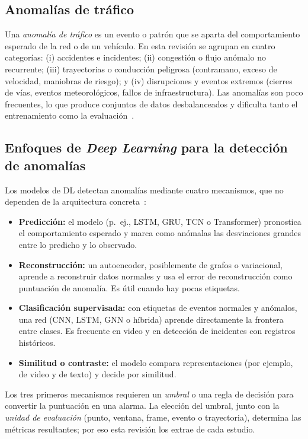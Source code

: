 \documentclass[12pt, a4paper]{article}
\begin{document}
\subsection{Anomal\'{i}as de tr\'{a}fico}

Una \textit{anomal\'{i}a de tr\'{a}fico} es un evento o patr\'{o}n que se aparta del comportamiento esperado de la red o de un veh\'{i}culo. En esta revisi\'{o}n se agrupan en cuatro categor\'{i}as: (i) accidentes e incidentes; (ii) congesti\'{o}n o flujo an\'{o}malo no recurrente; (iii) trayectorias o conducci\'{o}n peligrosa (contramano, exceso de velocidad, maniobras de riesgo); y (iv) disrupciones y eventos extremos (cierres de v\'{i}as, eventos meteorol\'{o}gicos, fallos de infraestructura). Las anomal\'{i}as son poco frecuentes, lo que produce conjuntos de datos desbalanceados y dificulta tanto el entrenamiento como la evaluaci\'{o}n~\cite{darban2024deep}.

\subsection{Enfoques de \textit{Deep Learning} para la detecci\'{o}n de anomal\'{i}as}

Los modelos de DL detectan anomal\'{i}as mediante cuatro mecanismos, que no dependen de la arquitectura concreta~\cite{darban2024deep}:
\begin{itemize}
  \item \textbf{Predicci\'{o}n:} el modelo (p.~ej., LSTM, GRU, TCN o Transformer) pronostica el comportamiento esperado y marca como an\'{o}malas las desviaciones grandes entre lo predicho y lo observado.
  \item \textbf{Reconstrucci\'{o}n:} un autoencoder, posiblemente de grafos o variacional, aprende a reconstruir datos normales y usa el error de reconstrucci\'{o}n como puntuaci\'{o}n de anomal\'{i}a. Es \'{u}til cuando hay pocas etiquetas.
  \item \textbf{Clasificaci\'{o}n supervisada:} con etiquetas de eventos normales y an\'{o}malos, una red (CNN, LSTM, GNN o h\'{i}brida) aprende directamente la frontera entre clases. Es frecuente en video y en detecci\'{o}n de incidentes con registros hist\'{o}ricos.
  \item \textbf{Similitud o contraste:} el modelo compara representaciones (por ejemplo, de video y de texto) y decide por similitud.
\end{itemize}
Los tres primeros mecanismos requieren un \textit{umbral} o una regla de decisi\'{o}n para convertir la puntuaci\'{o}n en una alarma. La elecci\'{o}n del umbral, junto con la \textit{unidad de evaluaci\'{o}n} (punto, ventana, frame, evento o trayectoria), determina las m\'{e}tricas resultantes; por eso esta revisi\'{o}n los extrae de cada estudio.
\end{document}
